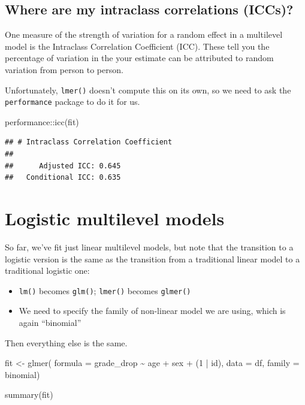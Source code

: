 \documentclass[
]{book}
\newenvironment{Shaded}{\begin{snugshade}}{\end{snugshade}}
\newcommand{\AttributeTok}[1]{\textcolor[rgb]{0.77,0.63,0.00}{#1}}
\newcommand{\DecValTok}[1]{\textcolor[rgb]{0.00,0.00,0.81}{#1}}
\newcommand{\FunctionTok}[1]{\textcolor[rgb]{0.00,0.00,0.00}{#1}}
\newcommand{\NormalTok}[1]{#1}
\newcommand{\OtherTok}[1]{\textcolor[rgb]{0.56,0.35,0.01}{#1}}
\newcommand{\SpecialCharTok}[1]{\textcolor[rgb]{0.00,0.00,0.00}{#1}}
\newcommand{\StringTok}[1]{\textcolor[rgb]{0.31,0.60,0.02}{#1}}
\providecommand{\tightlist}{%
  \setlength{\itemsep}{0pt}\setlength{\parskip}{0pt}}
\begin{document}
\hypertarget{where-are-my-intraclass-correlations-iccs}{%
\subsection{Where are my intraclass correlations (ICCs)?}\label{where-are-my-intraclass-correlations-iccs}}

One measure of the strength of variation for a random effect in a multilevel model is the Intraclass Correlation Coefficient (ICC). These tell you the percentage of variation in the your estimate can be attributed to random variation from person to person.

Unfortunately, \texttt{lmer()} doesn't compute this on its own, so we need to ask the \texttt{performance} package to do it for us.

\begin{Shaded}
\begin{Highlighting}[]
\NormalTok{performance}\SpecialCharTok{::}\FunctionTok{icc}\NormalTok{(fit)}
\end{Highlighting}
\end{Shaded}

\begin{verbatim}
## # Intraclass Correlation Coefficient
## 
##      Adjusted ICC: 0.645
##   Conditional ICC: 0.635
\end{verbatim}

\hypertarget{logistic-multilevel-models}{%
\section{Logistic multilevel models}\label{logistic-multilevel-models}}

So far, we've fit just linear multilevel models, but note that the transition to a logistic version is the same as the transition from a traditional linear model to a traditional logistic one:

\begin{itemize}
\tightlist
\item
  \texttt{lm()} becomes \texttt{glm()}; \texttt{lmer()} becomes \texttt{glmer()}
\item
  We need to specify the family of non-linear model we are using, which is again ``binomial''
\end{itemize}

Then everything else is the same.

\begin{Shaded}
\begin{Highlighting}[]
\NormalTok{fit }\OtherTok{\textless{}{-}} \FunctionTok{glmer}\NormalTok{(}
  \AttributeTok{formula =}\NormalTok{ grade\_drop }\SpecialCharTok{\textasciitilde{}}\NormalTok{ age }\SpecialCharTok{+}\NormalTok{ sex }\SpecialCharTok{+}\NormalTok{ (}\DecValTok{1} \SpecialCharTok{|}\NormalTok{ id),}
  \AttributeTok{data =}\NormalTok{ df,}
  \AttributeTok{family =} \StringTok{\textquotesingle{}binomial\textquotesingle{}}\NormalTok{)}

\FunctionTok{summary}\NormalTok{(fit)}
\end{Highlighting}
\end{Shaded}
\end{document}
